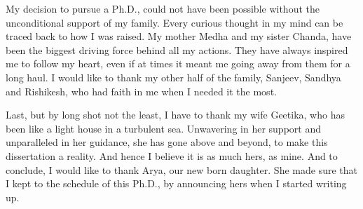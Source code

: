 \begin{acknowledgements}
My decision to pursue a Ph.D., could not have been possible without the unconditional support of my family. Every curious thought in my mind can be traced back to how I was raised. My mother Medha and my sister Chanda, have been the biggest driving force behind all my actions. They have always inspired me to follow my heart, even if at times it meant me going away from them for a long haul. I would like to thank my other half of the family, Sanjeev, Sandhya and Rishikesh, who had faith in me when I needed it the most.

Last, but by long shot not the least, I have to thank my wife Geetika, who has been like a light house in a turbulent sea. Unwavering in her support and unparalleled in her guidance, she has gone above and beyond, to make this dissertation a reality. And hence I believe it is as much hers, as mine. And to conclude, I would like to thank Arya, our new born daughter. She made sure that I kept to the schedule of this Ph.D., by announcing hers when I started writing up. 
\end{acknowledgements}
